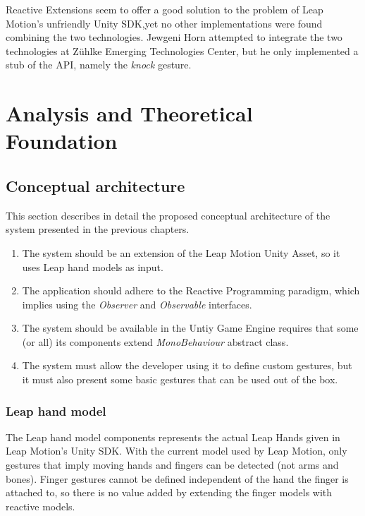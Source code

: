 \documentclass[12pt,a4paper,twoside]{report}
\begin{document}
Reactive Extensions seem to offer a good solution to the problem of Leap Motion's unfriendly Unity SDK,yet no other implementations were found combining the two technologies. Jewgeni Horn \cite{zuhlke} attempted to integrate the two technologies at Zühlke Emerging Technologies Center, but he only implemented a stub of the API, namely the \textit{knock} gesture.

\chapter{Analysis and Theoretical Foundation}

\section{Conceptual architecture}

This section describes in detail the proposed conceptual architecture of the system presented in the previous chapters.

\begin{enumerate}
  \item The system should be an extension of the Leap Motion Unity Asset, so it uses Leap hand models as input. \label{req:leap}
  \item The application should adhere to the Reactive Programming paradigm, which implies using the \textit{Observer} and \textit{Observable} interfaces. \label{req:rx}
  \item The system should be available in the Untiy Game Engine requires that some (or all) its components extend \textit{MonoBehaviour} abstract class. \label{req:unity}
  \item The system must allow the developer using it to define custom gestures, but it must also present some basic gestures that can be used out of the box. \label{req:custom}
\end{enumerate}  

\subsection{Leap hand model}
The Leap hand model components represents the actual Leap Hands given in Leap Motion's Unity SDK. With the current model used by Leap Motion, only gestures that imply moving hands and fingers can be detected (not arms and bones). Finger gestures cannot be defined independent of the hand the finger is attached to, so there is no value added by extending the finger models with reactive models.
\end{document}
